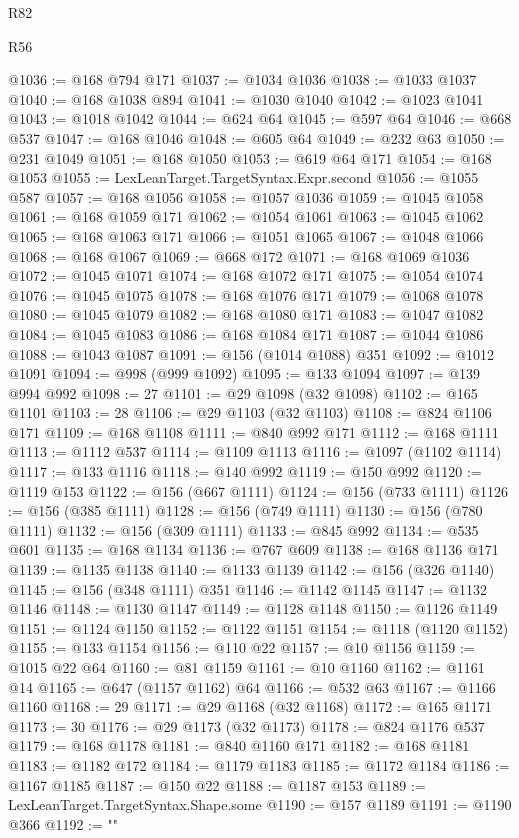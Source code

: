 \begin{lexlean}{R82}
\begin{lexlean}{R56}
\begin{coremodule}
{{{{{{{{{{{{{{{{{{{{{{{{{{{{{{{{{{{{{{{{{{{{{{{{{{{{{{{{{{{{{{{{{{{{{{{{{{{{{{{{{{{{{{{{{{{{{{{{{{{{{{{{{{{{{{{{{{{{{{{{{{{{{{{{{{{{{{{{{{{{{{{{{{{{{{{{{{{{{{{{{{{{{{{{{{{{{{{{{{{{{{{{{{{{{{{{{{{{{{{{{{{{{{{{{{{@1036 := @168 @794 @171
@1037 := @1034 @1036
@1038 := @1033 @1037
@1040 := @168 @1038 @894
@1041 := @1030 @1040
@1042 := @1023 @1041
@1043 := @1018 @1042
@1044 := @624 @64
@1045 := @597 @64
@1046 := @668 @537
@1047 := @168 @1046
@1048 := @605 @64
@1049 := @232 @63
@1050 := @231 @1049
@1051 := @168 @1050
@1053 := @619 @64 @171
@1054 := @168 @1053
@1055 := LexLeanTarget.TargetSyntax.Expr.second
@1056 := @1055 @587
@1057 := @168 @1056
@1058 := @1057 @1036
@1059 := @1045 @1058
@1061 := @168 @1059 @171
@1062 := @1054 @1061
@1063 := @1045 @1062
@1065 := @168 @1063 @171
@1066 := @1051 @1065
@1067 := @1048 @1066
@1068 := @168 @1067
@1069 := @668 @172
@1071 := @168 @1069 @1036
@1072 := @1045 @1071
@1074 := @168 @1072 @171
@1075 := @1054 @1074
@1076 := @1045 @1075
@1078 := @168 @1076 @171
@1079 := @1068 @1078
@1080 := @1045 @1079
@1082 := @168 @1080 @171
@1083 := @1047 @1082
@1084 := @1045 @1083
@1086 := @168 @1084 @171
@1087 := @1044 @1086
@1088 := @1043 @1087
@1091 := @156 (@1014 @1088) @351
@1092 := @1012 @1091
@1094 := @998 (@999 @1092)
@1095 := @133 @1094
@1097 := @139 @994 @992
@1098 := 27
@1101 := @29 @1098 (@32 @1098)
@1102 := @165 @1101
@1103 := 28
@1106 := @29 @1103 (@32 @1103)
@1108 := @824 @1106 @171
@1109 := @168 @1108
@1111 := @840 @992 @171
@1112 := @168 @1111
@1113 := @1112 @537
@1114 := @1109 @1113
@1116 := @1097 (@1102 @1114)
@1117 := @133 @1116
@1118 := @140 @992
@1119 := @150 @992
@1120 := @1119 @153
@1122 := @156 (@667 @1111)
@1124 := @156 (@733 @1111)
@1126 := @156 (@385 @1111)
@1128 := @156 (@749 @1111)
@1130 := @156 (@780 @1111)
@1132 := @156 (@309 @1111)
@1133 := @845 @992
@1134 := @535 @601
@1135 := @168 @1134
@1136 := @767 @609
@1138 := @168 @1136 @171
@1139 := @1135 @1138
@1140 := @1133 @1139
@1142 := @156 (@326 @1140)
@1145 := @156 (@348 @1111) @351
@1146 := @1142 @1145
@1147 := @1132 @1146
@1148 := @1130 @1147
@1149 := @1128 @1148
@1150 := @1126 @1149
@1151 := @1124 @1150
@1152 := @1122 @1151
@1154 := @1118 (@1120 @1152)
@1155 := @133 @1154
@1156 := @110 @22
@1157 := @10 @1156
@1159 := @1015 @22 @64
@1160 := @81 @1159
@1161 := @10 @1160
@1162 := @1161 @14
@1165 := @647 (@1157 @1162) @64
@1166 := @532 @63
@1167 := @1166 @1160
@1168 := 29
@1171 := @29 @1168 (@32 @1168)
@1172 := @165 @1171
@1173 := 30
@1176 := @29 @1173 (@32 @1173)
@1178 := @824 @1176 @537
@1179 := @168 @1178
@1181 := @840 @1160 @171
@1182 := @168 @1181
@1183 := @1182 @172
@1184 := @1179 @1183
@1185 := @1172 @1184
@1186 := @1167 @1185
@1187 := @150 @22
@1188 := @1187 @153
@1189 := LexLeanTarget.TargetSyntax.Shape.some
@1190 := @157 @1189
@1191 := @1190 @366
@1192 := "{"
}}}}}}}}}}}}}}}}}}}}}}}}}}}}}}}}}}}}}}}}}}}}}}}}}}}}}}}}}}}}}}}}}}}}}}}}}}}}}}}}}}}}}}}}}}}}}}}}}}}}}}}}}}}}}}}}}}}}}}}}}}}}}}}}}}}}}}}}}}}}}}}}}}}}}}}}}}}}}}}}}}}}}}}}}}}}}}}}}}}}}}}}}}}}}}}}}}}}}}}}}}}}}}}}}}}}
\end{coremodule}
\end{lexlean}
\end{lexlean}
